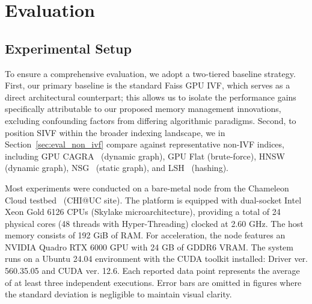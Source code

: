 \documentclass[sigconf,nonacm]{acmart}
\newcommand{\don}[1]{\textcolor{blue}{[Dongfang: #1]}}
\theoremstyle{plain}
\theoremstyle{definition}
\theoremstyle{remark}
\begin{document}
\section{Evaluation}
\label{sec:evaluation}



\subsection{Experimental Setup}
\label{sec:exp_setup}

To ensure a comprehensive evaluation, we adopt a two-tiered baseline strategy. 
First, our primary baseline is the standard Faiss GPU IVF, which serves as a direct architectural counterpart; this allows us to isolate the performance gains specifically attributable to our proposed memory management innovations, excluding confounding factors from differing algorithmic paradigms. 
Second, to position SIVF within the broader indexing landscape, we in Section~\ref{sec:eval_non_ivf} compare against representative non-IVF indices, including GPU CAGRA~\cite{10597683} (dynamic graph), GPU Flat (brute-force), HNSW~\cite{malkov2018efficient} (dynamic graph), NSG~\cite{10.14778/3303753.3303754} (static graph), and LSH~\cite{10.1145/997817.997857} (hashing).

Most experiments were conducted on a bare-metal node from the Chameleon Cloud testbed~\cite{keahey2020lessons} (CHI@UC site). The platform is equipped with dual-socket Intel Xeon Gold 6126 CPUs (Skylake microarchitecture), providing a total of 24 physical cores (48 threads with Hyper-Threading) clocked at 2.60 GHz. The host memory consists of 192 GiB of RAM. 
For acceleration, the node features an NVIDIA Quadro RTX 6000 GPU with 24 GB of GDDR6 VRAM. The system runs on a Ubuntu 24.04 environment with the CUDA toolkit installed: Driver ver. 560.35.05 and CUDA ver. 12.6.
Each reported data point represents the average of at least three independent executions. Error bars are omitted in figures where the standard deviation is negligible to maintain visual clarity. 
\end{document}
